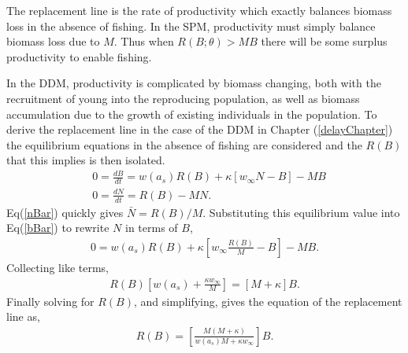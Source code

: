 %
The replacement line is the rate of productivity which exactly balances
biomass loss in the absence of fishing. In the SPM, %
productivity must simply balance biomass loss due to $M$. Thus when
$R(B;\theta)>MB$ there will be some surplus productivity to enable
fishing.

%
In the DDM, productivity is complicated by biomass changing, both
with the recruitment of young into the reproducing population, as well as
biomass accumulation due to the growth of existing individuals in the
population. To derive the replacement line in the case of the DDM in Chapter (\ref{delayChapter})
the equilibrium equations in the absence of fishing are considered and
the $R(B)$ that this implies is then isolated.
%
\begin{align}
&0=\frac{dB}{dt} = w(a_s)R(B) + \kappa \left[w_\infty N-B\right] - MB \label{bBar}\\
&0=\frac{dN}{dt} = R(B) - MN. \label{nBar}
\end{align}
%
Eq(\ref{nBar}) quickly gives $\bar{N} = R(B)/M$. Substituting this equilibrium
value into Eq(\ref{bBar}) to rewrite $N$ in terms of $B$,
%
\begin{align}
0 = w(a_s)R(B) + \kappa \left[w_\infty \frac{R(B)}{M}-B\right] - MB. %
\end{align}
Collecting like terms,
\begin{align}
R(B)\left[w(a_s)+\frac{\kappa w_\infty}{M}\right] = \left[M+\kappa\right]B. %
\end{align}
Finally solving for $R(B)$, and simplifying, gives the equation of the replacement line as,
\begin{align}
R(B) = \left[\frac{M(M+\kappa)}{w(a_s)M+\kappa w_\infty}\right]B. %
\end{align}


